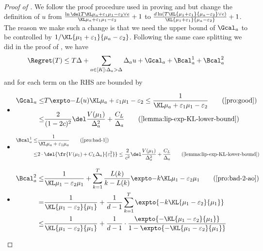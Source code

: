 \begin{proof}[Proof of ]
    We follow the proof procedure used in proving  and  but change the definition of $u$ from $\expDefU + 1$ to $\tfrac{d\ln(T\KL{\mu_1+\varepsilon_1}{\mu_a-\varepsilon_2} \vee e)}{\KL{\mu_1+\varepsilon_1}{\mu_a-\varepsilon_2}} + 1$.
    The reason we make such a change is that we need the upper bound of $\Gcal_a$ to be controlled by $1 / \KL{\mu_1+\varepsilon_1}{\mu_a-\varepsilon_2}$.
    Following the same case splitting we did in the proof of , we have
    \[
        \Regret(T) \leq T\Delta + \sum_{a\in[K]: \Delta_a > \Delta} \Delta_a u + \Gcal_a + \Bcal^1_a + \Bcal^2_a
    \]
    and for each term on the RHS are bounded by
    \begin{itemize}
        \item 
        \begin{align*}
            \Gcal_a 
            \leq& \ExpFOne \leq \GoodEventBound 
                    \tag{\Cref{pro:good}}
            \\
            \leq& \frac{2}{(1-2c)^2}\CommonFactorInRegretBound
                    \tag{\Cref{lemma:lip-exp-KL-lower-bound}}
        \end{align*}
        \item
        \begin{align*}
            \Bcal_a^1 
            \leq& \ExpFTwo
                    \tag{\Cref{pro:bad-1}}
            \\
            \leq& 2 \cdot \del{\fr {V(\mu_1)+C_L\Delta_a}{\varepsilon_1^2}}
            \leq
            \frac{2}{c^2} \CommonFactorInRegretBound
                    \tag{\Cref{lemma:lip-exp-KL-lower-bound}}
        \end{align*}
        \item 
        \begin{align*}
            \Bcal_a^2
            \leq& \ExpFThreeAO
                \tag{\Cref{pro:bad-2-ao}}
            \\
            =&
                \frac{1}{\KL{\mu_1 - \varepsilon_2}{\mu_1}} 
                + \frac{1}{d-1}\sum_{k=1}^T \expto{-k \KL{\mu_1-\varepsilon_2}{\mu_1}}
            \\
            \leq&
                \frac{1}{\KL{\mu_1 - \varepsilon_2}{\mu_1}} 
                + \frac{1}{d-1} \cdot \frac{\expto{-\KL{\mu_1-\varepsilon_2}{\mu_1}}}{1 - \expto{-\KL{\mu_1-\varepsilon_2}{\mu_1}}}

\end{align*}
\end{itemize}
\end{proof}
